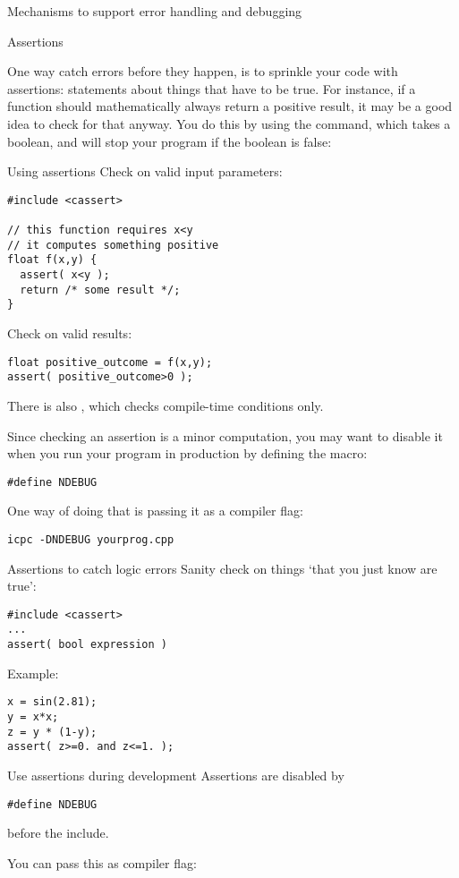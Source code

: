  {Mechanisms to support error handling and debugging}

 {Assertions}

One way catch errors before they happen, is to sprinkle your code with
assertions: statements about things that have to be true. For
instance, if a function should mathematically always return a positive
result, it may be a good idea to check for that anyway. You do this by
using the  command, which takes a boolean, and
will stop your program if the boolean is false:

\begin{block}{Using assertions}
 \label{sl:use-assert}
 Check on valid input parameters:
\begin{lstlisting}
#include <cassert>

// this function requires x<y
// it computes something positive
float f(x,y) {
  assert( x<y );
  return /* some result */;
}
\end{lstlisting}
Check on valid results:
\begin{lstlisting}
float positive_outcome = f(x,y);
assert( positive_outcome>0 );
\end{lstlisting}
\end{block}

There is also , which
checks compile-time conditions only.

Since checking an assertion is a minor computation, you may want to
disable it when you run your program in production by defining the
 macro:
\begin{lstlisting}
#define NDEBUG
\end{lstlisting}
One way of doing that is passing it as a compiler flag:
\begin{verbatim}
icpc -DNDEBUG yourprog.cpp
\end{verbatim}

\begin{slide}{Assertions to catch logic errors}
  \label{sl:cpp-assert1}
  Sanity check on things `that you just know are true':
\begin{lstlisting}
#include <cassert>
...
assert( bool expression )
\end{lstlisting}
Example:
\begin{lstlisting}
x = sin(2.81);
y = x*x;
z = y * (1-y);
assert( z>=0. and z<=1. );
\end{lstlisting}
\end{slide}

\begin{slide}{Use assertions during development}
  \label{sl:cpp-assert2}
Assertions are disabled by
\begin{lstlisting}
#define NDEBUG
\end{lstlisting}
before the include.

You can pass this as compiler flag:\\
\end{slide}

